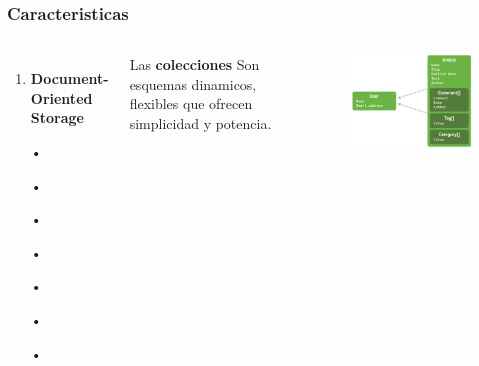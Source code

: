 \documentclass{beamer}
\begin{document}
\begin{frame}
\frametitle{Caracteristicas}
\begin{columns}[c] %

\begin{enumerate}
\item \textbf{Document-Oriented Storage}
\item[•]	
\item[•]	
\item[•]	
\item[•]	
\item[•]	
\item[•]	
\item[•]	
\end{enumerate}

Las \textbf{colecciones} Son esquemas dinamicos, flexibles que ofrecen simplicidad y potencia.
\begin{figure}
\includegraphics[width=0.9\linewidth]{document.png}
\end{figure}
\end{columns}
\end{frame}
\end{document}
